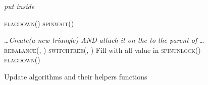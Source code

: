 \begin{figure}[!t]
\centering
\begin{algorithmic} [1]                   
\small
			   
		\Else
\State \textit{put  inside } \label{lst:line:insertbuffer}
			\State 
        			\State 
\EndIf            
          	                                            			

                
                
                		\State \textsc{flagdown}()                                      
                		\State \textsc{spinwait}()                                           
                
                		\State 
                		
                		\If {}                             
                    		\State \ldots \textit{Create(a new triangle) AND attach it on the to the parent of } \ldots                   
                		\Else
                        			\State  \textsc{rebalance}(, )
                        			\State \textsc{switchtree}(, )
                        			\State 
                    		\Else
                        			\If{}
                            			\State Fill  with all value in  	
                            			\State 
                        			\EndIf                             
				\EndIf
                		\EndIf	
			\State \textsc{spinunlock}()   
		\Else
			\State \textsc{flagdown}() 
		\EndIf    
	\EndIf                                  
\EndIf
\State \Return 
\EndFunction
\end{algorithmic}
\caption{Update algorithms and their helpers functions}\label{lst:pseudo-ops}
\end{figure}

